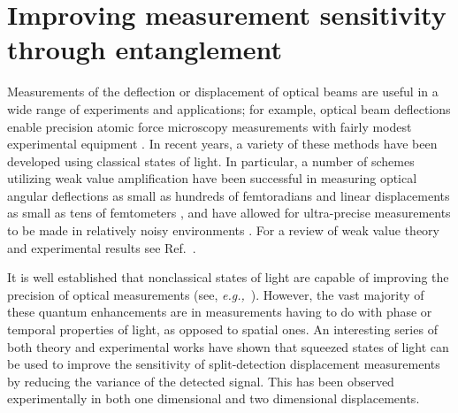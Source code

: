 \chapter[Biphoton displacement measurements]{Improving measurement sensitivity through entanglement}\label{ch:biphotons}
Measurements of the deflection or displacement of optical beams are useful in a wide range of experiments and applications; for example, optical beam deflections enable precision atomic force microscopy measurements with fairly modest experimental equipment \cite{Putnam1992}.  
In recent years, a variety of these methods have been developed using classical states of light.  
In particular, a number of schemes utilizing weak value amplification have been successful in measuring optical angular deflections as small as hundreds of femtoradians and linear displacements as small as tens of femtometers \cite{Dixon2009}, and have allowed for ultra-precise measurements to be made in relatively noisy environments \cite{Hosten2008}. 
For a review of weak value theory and experimental results see Ref.~\cite{Dressel2014}. 

It is well established that nonclassical states of light are capable of improving the precision of optical measurements (see, \emph{e.g.,}~\cite{Agarwal2013,giovannetti2006}).  
However, the vast majority of these quantum enhancements are in measurements having to do with phase or temporal properties of light, as opposed to spatial ones.  
An interesting series of both theory and experimental works \cite{Fabre2000, Treps2002, Treps2003, Barnett2003} have shown that squeezed states of light can be used to improve the sensitivity of split-detection displacement measurements by reducing the variance of the detected signal.  
This has been observed experimentally in both one dimensional \cite{Treps2002} and two dimensional \cite{Treps2003} displacements. 

